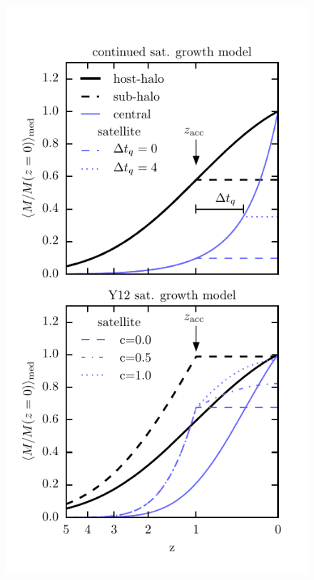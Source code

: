 \documentclass[a4paper,fleqn,usenatbib]{mnras}
\begin{document}
\begin{figure}
    \includegraphics{figures/sat_growth_model_2_panel.pdf}

\end{figure}
\end{document}
